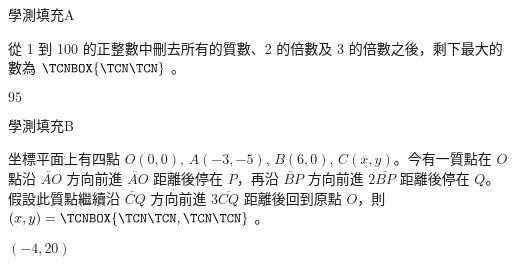     \begin{QUESTION}
        \begin{ExamInfo}{98}{學測}{填充}{A}
        \end{ExamInfo}
        \begin{ExamAnsRateInfo}{76}{92}{86}{50}
        \end{ExamAnsRateInfo}
        \begin{QBODY}
            從 1 到 100 的正整數中刪去所有的質數、2 的倍數及 3 的倍數之後，剩下最大的數為 $\TCNBOX{\TCN\TCN}$ 。
        \end{QBODY}
        \begin{QFROMS}
        \end{QFROMS}
        \begin{QTAGS}\end{QTAGS}
        \begin{QANS}
            $95$
        \end{QANS}
        \begin{QSOLLIST}
        \end{QSOLLIST}
        \begin{QEMPTYSPACE}
        \end{QEMPTYSPACE}
    \end{QUESTION}
    \begin{QUESTION}
        \begin{ExamInfo}{98}{學測}{填充}{B}
        \end{ExamInfo}
        \begin{ExamAnsRateInfo}{31}{69}{22}{2}
        \end{ExamAnsRateInfo}
        \begin{QBODY}
            坐標平面上有四點 $O(0,0)$, $A(-3,-5)$, $B(6,0)$, $C(x,y)$。今有一質點在 $O$ 點沿 $\lvec{AO}$ 方向前進 $\lvec{AO}$ 距離後停在 $P$，再沿 $\lvec{BP}$ 方向前進 $2\overline{BP}$ 距離後停在 $Q$。 假設此質點繼續沿 $\lvec{CQ}$ 方向前進 $3\overline{CQ}$ 距離後回到原點 $O$，則 $(x,y)=\TCNBOX{\TCN\TCN,\TCN\TCN}$ 。
        \end{QBODY}
        \begin{QFROMS}
        \end{QFROMS}
        \begin{QTAGS}\end{QTAGS}
        \begin{QANS}
            $(-4,20)$
        \end{QANS}
        \begin{QSOLLIST}
        \end{QSOLLIST}
        \begin{QEMPTYSPACE}
        \end{QEMPTYSPACE}
    \end{QUESTION}
